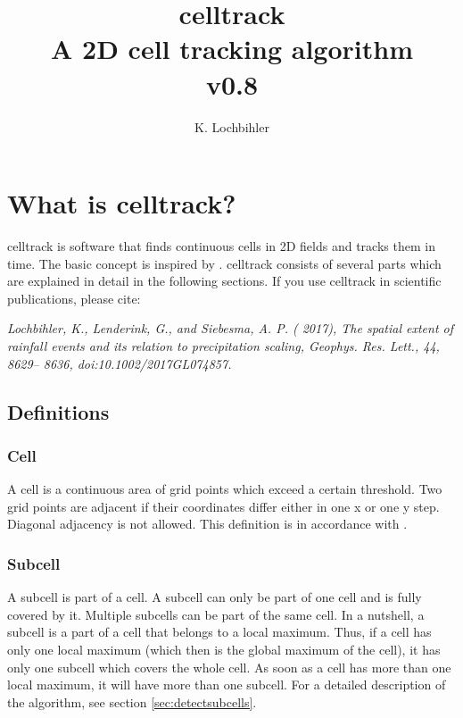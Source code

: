 \documentclass{scrartcl}
\title{celltrack\\
	A 2D cell tracking algorithm\\ \medskip
	v0.8}
\author{K. Lochbihler}
\begin{document}
	
\maketitle

\section{What is celltrack?}
celltrack is software that finds continuous cells in 2D fields and tracks them in time. The basic concept is inspired by \cite{moseley2013}. celltrack consists of several parts which are explained in detail in the following sections.
If you use celltrack in scientific publications, please cite:

\smallskip
\textit{Lochbihler, K., Lenderink, G., and Siebesma, A. P. ( 2017), The spatial extent of rainfall events and its relation to precipitation scaling, Geophys. Res. Lett., 44, 8629– 8636, doi:10.1002/2017GL074857. }

\subsection{Definitions}

\subsubsection*{Cell}
A cell is a continuous area of grid points which exceed a certain threshold. Two grid points are adjacent if their coordinates differ either in one x or one y step. Diagonal adjacency is not allowed. This definition is in accordance with \cite{moseley2013}.

\subsubsection*{Subcell}
A subcell is part of a cell. A subcell can only be part of one cell and is fully covered by it. Multiple subcells can be part of the same cell. In a nutshell, a subcell is a part of a cell that belongs to a local maximum. Thus, if a cell has only one local maximum (which then is the global maximum of the cell), it has only one subcell which covers the whole cell. As soon as a cell has more than one local maximum, it will have more than one subcell. For a detailed description of the algorithm, see section \ref{sec:detectsubcells}.
\end{document}

